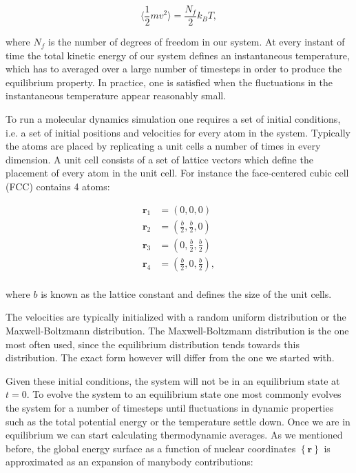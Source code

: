 \begin{equation}
 \langle \frac{1}{2} m v^2 \rangle = \frac{N_f}{2} k_B T , 
\end{equation}

where $N_f$ is the number of degrees of freedom in our system.
At every instant of time the total kinetic energy
of our system defines an instantaneous temperature,
which has to averaged over a large number of timesteps
in order to produce the equilibrium property.
In practice, one is satisfied when the fluctuations
in the instantaneous temperature appear reasonably small.
\par
To run a molecular dynamics simulation one requires
a set of initial conditions, i.e. a set of initial positions and velocities
for every atom in the system. Typically the atoms
are placed by replicating a unit cells a number of times
in every dimension. A unit cell consists of a set
of lattice vectors which define the placement of every atom in the
unit cell. For instance the face-centered cubic cell (FCC)
contains 4 atoms:

\begin{equation}
    \begin{split}
        \bm{r}_1 &= (0, 0, 0) \\
        \bm{r}_2 &= (\frac{b}{2}, \frac{b}{2}, 0) \\
        \bm{r}_3 &= (0, \frac{b}{2}, \frac{b}{2}) \\
        \bm{r}_4 &= (\frac{b}{2}, 0, \frac{b}{2}) , \\
    \end{split}
\end{equation}

where $b$ is known as the lattice constant and defines
the size of the unit cells.
\par
The velocities are typically initialized with a random uniform
distribution or the Maxwell-Boltzmann distribution.
The Maxwell-Boltzmann distribution is the one most often used,
since the equilibrium distribution tends towards this distribution.
The exact form however will differ from the one we started with.
\par
Given these initial conditions, the system will not be in an
equilibrium state at $t=0$. To evolve the system
to an equilibrium state one most commonly evolves the system
for a number of timesteps until fluctuations in dynamic
properties such as the total potential energy or the temperature
settle down. Once we are in equilibrium we can start calculating
thermodynamic averages.
\newline
\newline
As we mentioned before, the global energy surface
as a function of nuclear coordinates $\left\{ \bm{r} \right\}$
is approximated as an expansion of manybody contributions:

